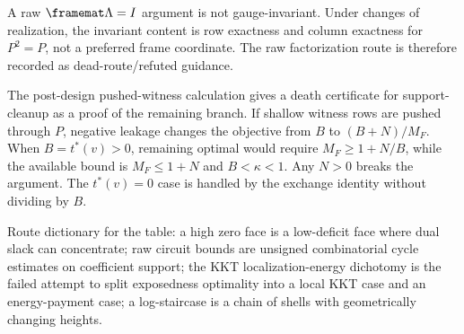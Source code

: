 \begin{refutedstatement}
 A raw \(\framemat\Lambda=I\) argument is not gauge-invariant.  Under
changes of realization, the invariant content is row exactness and column exactness for
\(P^2=P\), not a preferred frame coordinate.  The raw factorization route is therefore
recorded as dead-route/refuted guidance.
\end{refutedstatement}

\begin{downgradedstatement}
\provedbadge The post-design pushed-witness calculation gives a death certificate for
support-cleanup as a proof of the remaining branch.  If shallow witness rows are pushed
through \(P\), negative leakage changes the objective from \(B\) to \((B+N)/M_F\).  When
\(B=t^*(v)>0\), remaining optimal would require \(M_F\ge 1+N/B\), while the available
bound is \(M_F\le 1+N\) and \(B<\kappa<1\).  Any \(N>0\) breaks the argument.  The
\(t^*(v)=0\) case is handled by the exchange identity without dividing by \(B\).
\end{downgradedstatement}

Route dictionary for the table: a high zero face is a low-deficit face where
dual slack can concentrate; raw circuit bounds are unsigned combinatorial
cycle estimates on coefficient support; the KKT localization-energy dichotomy
is the failed attempt to split exposedness optimality into a local KKT case and
an energy-payment case; a log-staircase is a chain of shells with geometrically
changing heights.

